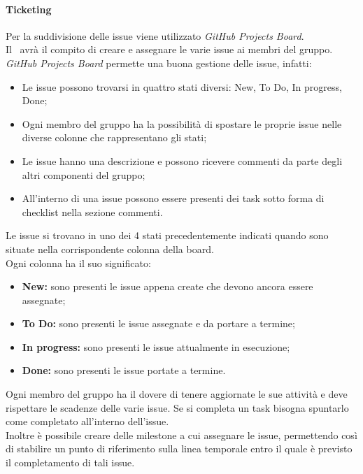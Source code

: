      \paragraph{Ticketing}
        Per la suddivisione delle issue viene utilizzato \textit{GitHub Projects Board}\glo.\\
        Il \roleProjectManager\ avrà il compito di creare e assegnare le varie issue ai membri del gruppo.\\
        \textit{GitHub Projects Board} permette una buona gestione delle issue, infatti:
        \begin{itemize}
          \item Le issue possono trovarsi in quattro stati diversi: New, To Do, In progress, Done;
          \item Ogni membro del gruppo ha la possibilità di spostare le proprie issue nelle diverse colonne che rappresentano gli stati;
          \item Le issue hanno una descrizione e possono ricevere commenti da parte degli altri componenti del gruppo;
          \item All'interno di una issue possono essere presenti dei task sotto forma di checklist nella sezione commenti.
        \end{itemize}
        Le issue si trovano in uno dei 4 stati precedentemente indicati quando sono situate nella corrispondente colonna della board.\\
        Ogni colonna ha il suo significato:
        \begin{itemize}
          \item \textbf{New:} sono presenti le issue appena create che devono ancora essere assegnate;
          \item \textbf{To Do:} sono presenti le issue assegnate e da portare a termine;
          \item \textbf{In progress:} sono presenti le issue attualmente in esecuzione;
          \item \textbf{Done:} sono presenti le issue portate a termine.
        \end{itemize}
        Ogni membro del gruppo ha il dovere di tenere aggiornate le sue attività e deve rispettare le scadenze delle varie issue.
        Se si completa un task bisogna spuntarlo come completato all'interno dell'issue.\\
        Inoltre è possibile creare delle milestone a cui assegnare le issue, permettendo così di stabilire un punto di riferimento 
        sulla linea temporale entro il quale è previsto il completamento di tali issue.

